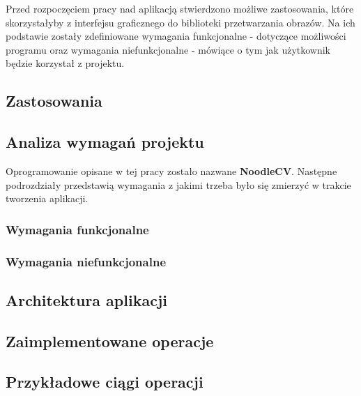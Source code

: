 
Przed rozpoczęciem pracy nad aplikacją stwierdzono możliwe zastosowania, które skorzystałyby z interfejsu graficznego do biblioteki przetwarzania obrazów.
Na ich podstawie zostały zdefiniowane wymagania funkcjonalne - dotyczące możliwości programu oraz wymagania niefunkcjonalne - mówiące o tym jak użytkownik będzie korzystał z projektu.

\subsection{Zastosowania}



\subsection{Analiza wymagań projektu}
Oprogramowanie opisane w tej pracy zostało nazwane \textbf{NoodleCV}. 
Następne podrozdziały przedstawią wymagania z jakimi trzeba było się zmierzyć w trakcie tworzenia aplikacji.

\subsubsection{Wymagania funkcjonalne}


\subsubsection{Wymagania niefunkcjonalne}


\subsection{Architektura aplikacji}


\subsection{Zaimplementowane operacje}


\subsection{Przykładowe ciągi operacji}
